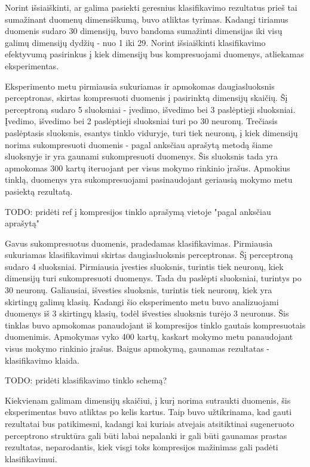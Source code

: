 \documentclass{VUMIFPSbakalaurinis}
\newcommand{\TODO}[1]{
\colorbox{todo-background-color}{TODO: #1}
}
\begin{document}
Norint išsiaiškinti, ar galima pasiekti geresnius klasifikavimo rezultatus prieš tai sumažinant duomenų dimensiškumą, buvo atliktas tyrimas.
Kadangi tiriamus duomenis sudaro 30 dimensijų, buvo bandoma sumažinti dimensijas iki visų galimų dimensijų dydžių - nuo 1 iki 29.
Norint išsiaiškinti klasifikavimo efektyvumą pasirinkus į kiek dimensijų bus kompresuojami duomenys, atliekamas eksperimentas.

Eksperimento metu pirmiausia sukuriamas ir apmokomas daugiasluoksnis perceptronas, skirtas kompresuoti duomenis į pasirinktą dimensijų skaičių.
Šį perceptroną sudaro 5 sluoksniai - įvedimo, išvedimo bei 3 paslėptieji sluoksniai.
Įvedimo, išvedimo bei 2 paslėptieji sluoksniai turi po 30 neuronų.
Trečiasis paslėptasis sluoksnis, esantys tinklo viduryje, turi tiek neuronų, į kiek dimensijų norima sukompresuoti duomenis - pagal anksčiau aprašytą metodą šiame sluoksnyje ir yra gaunami sukompresuoti duomenys.
Šis sluoksnis tada yra apmokomas 300 kartų iteruojant per visus mokymo rinkinio įrašus.
Apmokius tinklą, duomenys yra sukompresuojami pasinaudojant geriausią mokymo metu pasiektą rezultatą.

\TODO{pridėti ref į kompresijos tinklo aprašymą vietoje "pagal anksčiau aprašytą"}

Gavus sukompresuotus duomenis, pradedamas klasifikavimas.
Pirmiausia sukuriamas klasifikavimui skirtas daugiasluoksnis perceptronas.
Šį perceptroną sudaro 4 sluoksniai.
Pirmiausia įvesties sluoksnis, turintis tiek neuronų, kiek dimensijų turi sukompresuoti duomenys.
Tada du paslėpti sluoksniai, turintys po 30 neuronų.
Galiausiai, išvesties sluoksnis, turintis tiek neuronų, kiek yra skirtingų galimų klasių.
Kadangi šio eksperimento metu buvo analizuojami duomenys iš 3 skirtingų klasių, todėl išvesties sluoksnis turėjo 3 neuronus.
Šis tinklas buvo apmokomas panaudojant iš kompresijos tinklo gautais kompresuotais duomenimis.
Apmokymas vyko 400 kartų, kaskart mokymo metu panaudojant visus mokymo rinkinio įrašus.
Baigus apmokymą, gaunamas rezultatas - klasifikavimo klaida.

\TODO{pridėti klasifikavimo tinklo schemą?}

Kiekvienam galimam dimensijų skaičiui, į kurį norima sutraukti duomenis, šis eksperimentas buvo atliktas po kelis kartus.
Taip buvo užtikrinama, kad gauti rezultatai bus patikimesni, kadangi kai kuriais atvejais atsitiktinai sugeneruoto perceptrono struktūra gali būti labai nepalanki ir gali būti gaunamas prastas rezultatas, neparodantis, kiek visgi toks kompresijos mažinimas gali padėti klasifikavimui.
\end{document}
